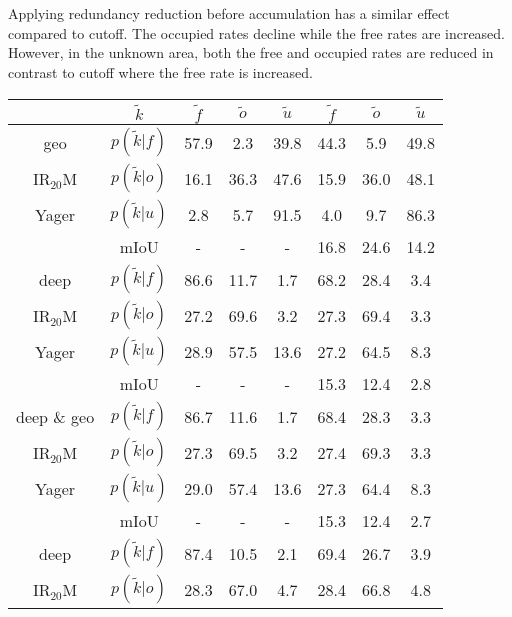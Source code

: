 \\\\
Applying redundancy reduction before accumulation has a similar effect compared to cutoff. The occupied rates decline while the free rates are increased. However, in the unknown area, both the free and occupied rates are reduced in contrast to cutoff where the free rate is increased. 
\begin{center}
	\begin{tabular}{c|c|ccc|ccc}
		& $\tilde{k}$ & $\tilde{f}$ & $\tilde{o}$ & $\tilde{u}$ & $\tilde{f}$ & $\tilde{o}$ & $\tilde{u}$\\
		\hline
		geo&$p(\tilde{k}|f)$ & \textcolor{mygreen}{57.9} & \textcolor{myred}{2.3} & 39.8& \textcolor{mygreen}{44.3} & \textcolor{myred}{5.9} & 49.8 \\
		IR$_{20}$M&$p(\tilde{k}|o)$ & \textcolor{myred}{16.1} & \textcolor{mygreen}{36.3} & 47.6& \textcolor{myred}{15.9} & \textcolor{mygreen}{36.0} & 48.1 \\
		Yager&$p(\tilde{k}|u)$ & 2.8 & 5.7 & 91.5& 4.0 & 9.7 & 86.3 \\
		& mIoU & - & - & - &16.8&24.6&14.2 \\
		\hline	
		deep&$p(\tilde{k}|f)$ & \textcolor{mygreen}{86.6} & \textcolor{myred}{11.7} & 1.7& \textcolor{mygreen}{68.2} & \textcolor{myred}{28.4} & 3.4 \\
		IR$_{20}$M&$p(\tilde{k}|o)$ & \textcolor{myred}{27.2} & \textcolor{mygreen}{69.6} & 3.2& \textcolor{myred}{27.3} & \textcolor{mygreen}{69.4} & 3.3 \\
		Yager&$p(\tilde{k}|u)$ & 28.9 & 57.5 & 13.6& 27.2 & 64.5 & 8.3 \\
		& mIoU & - & - & - &15.3&12.4&2.8 \\
		\hline
		deep \& geo&$p(\tilde{k}|f)$ & \textcolor{mygreen}{86.7} & \textcolor{myred}{11.6} & 1.7& \textcolor{mygreen}{68.4} & \textcolor{myred}{28.3} & 3.3 \\
		IR$_{20}$M&$p(\tilde{k}|o)$ & \textcolor{myred}{27.3} & \textcolor{mygreen}{69.5} & 3.2& \textcolor{myred}{27.4} & \textcolor{mygreen}{69.3} & 3.3 \\
		Yager&$p(\tilde{k}|u)$ & 29.0 & 57.4 & 13.6& 27.3 & 64.4 & 8.3 \\
		& mIoU & - & - & - &15.3&12.4&2.7 \\
		\hline
		deep&$p(\tilde{k}|f)$ & \textcolor{mygreen}{87.4} & \textcolor{myred}{10.5} & 2.1& \textcolor{mygreen}{69.4} & \textcolor{myred}{26.7} & 3.9 \\
		IR$_{20}$M&$p(\tilde{k}|o)$ & \textcolor{myred}{28.3} & \textcolor{mygreen}{67.0} & 4.7& \textcolor{myred}{28.4} & \textcolor{mygreen}{66.8} & 4.8 \\

\end{tabular}
\end{center}
